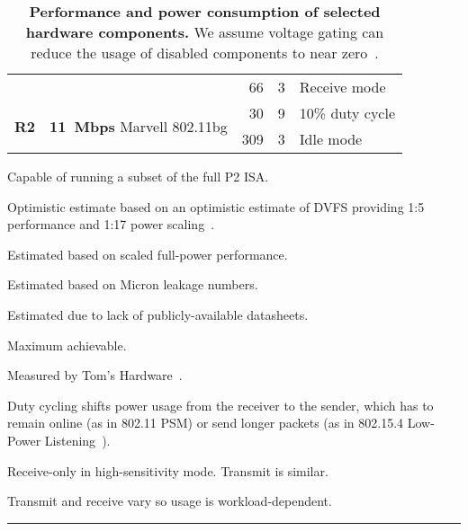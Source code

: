 \begin{table}[t]
\begin{threeparttable}
{\begin{tabularx}{\columnwidth}{p{0.05in}lr@{.}lX}
& &
66 & 3\tnote{9} &
Receive mode\tnote{9}
\\ \cmidrule(lr){2-5}

\multirow{2}{*}{\textbf{R2}} & \multirow{2}{*}{\textbf{11~Mbps} Marvell 802.11bg} &
30 & 9\tnote{3} &
10\% duty cycle\tnote{8}
\\

& &
309 & 3\tnote{10} &
Idle mode\tnote{10}
\\

\end{tabularx}
}
{\footnotesize
\begin{tablenotes}
\item [1] Capable of running a subset of the full P2 ISA.
\item [2] Optimistic estimate based on an optimistic estimate of DVFS providing 1:5 performance and
1:17 power scaling~\cite{jssc02-PowerPC-SoC}.
\item [3] Estimated based on scaled full-power performance.
\item [4] Estimated based on Micron leakage numbers.
\item [5] Estimated due to lack of publicly-available datasheets.
\item [6] Maximum achievable.
\item [7] Measured by Tom's Hardware~\cite{ssd-tomshardware}.
\item [8] Duty cycling shifts power usage from the receiver to the sender,
which has to remain online (as in 802.11 PSM) or send longer packets (as in
802.15.4 Low-Power Listening~\cite{tinyos-lpl}).
\item [9] Receive-only in high-sensitivity mode. Transmit is similar.
\item [10] Transmit and receive vary so usage is workload-dependent.
\end{tablenotes}
}
\vspace*{-0.05in}
\caption{\small \textbf{Performance and power consumption of selected hardware
components.} We assume voltage gating can reduce the usage of disabled
components to near zero~\cite{islped-vdd-gate}.}
\end{threeparttable}
\label{table-components}
\vspace{0.10in}
\hrule
\vspace{-0.20in}
\end{table}
